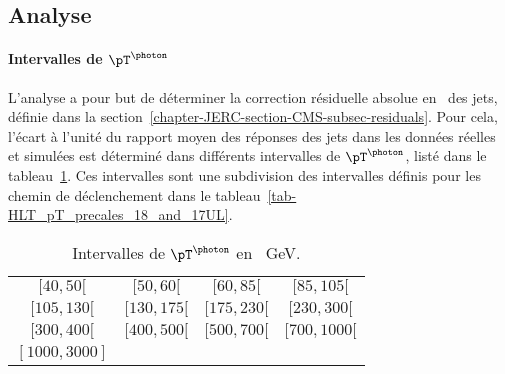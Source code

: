 \subsection{Analyse}\label{chapter-JERC-section-JES-subsec-analyse}
\paragraph{Intervalles de $\pT^{\photon}$}
L'analyse a pour but de déterminer la correction résiduelle absolue en \pT\ des jets, définie dans la section~\ref{chapter-JERC-section-CMS-subsec-residuals}.
Pour cela, l'écart à l'unité du rapport moyen des réponses des jets dans les données réelles et simulées est déterminé dans différents intervalles de $\pT^{\photon}$, listé dans le tableau~\ref{tab-pT_photon_intervalles}.
Ces intervalles sont une subdivision des intervalles définis pour les chemin de déclenchement dans le tableau~\ref{tab-HLT_pT_precales_18_and_17UL}.
\begin{table}[h]
\centering
\begin{tabular}{cccc}
\toprule
$[\num{40}, \num{50}[$ & $[\num{50}, \num{60}[$ & $[\num{60}, \num{85}[$ & $[\num{85}, \num{105}[$ \\
$[\num{105}, \num{130}[$ & $[\num{130}, \num{175}[$ & $[\num{175}, \num{230}[$ & $[\num{230}, \num{300}[$ \\
$[\num{300}, \num{400}[$ & $[\num{400}, \num{500}[$ & $[\num{500}, \num{700}[$ & $[\num{700}, \num{1000}[$ \\
$[\num{1000}, \num{3000}]$ \\
\bottomrule
\end{tabular}
\caption[Intervalles de $\pT^{\photon}$.]{Intervalles de $\pT^{\photon}$ en \SI{}{\GeV}.}
\label{tab-pT_photon_intervalles}
\end{table}
